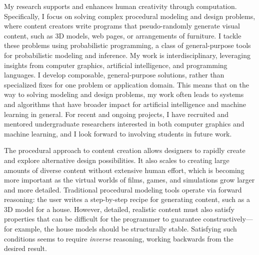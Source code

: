 \documentclass[
10pt, %
a4paper, %
oneside, %
headinclude,footinclude, %
BCOR5mm, %
]{scrartcl}
\title{\normalfont\spacedallcaps{Daniel Ritchie}} %
\author{\spacedallcaps{Research Statement}} %
\date{} %
\begin{document}

\pagestyle{scrheadings}
\clearscrheadings
\newcommand{\headertext}{\spacedlowsmallcaps{\color{black} Daniel Ritchie \color{halfgray} Research Statement}}
\ohead{\headertext}
\cfoot[\pagemark]{\pagemark}


\maketitle

My research supports and enhances human creativity through computation.
Specifically, I focus on solving complex procedural modeling and design problems, where content creators write programs that pseudo-randomly generate visual content, such as 3D models, web pages, or arrangements of furniture. I tackle these problems using probabilistic programming, a class of general-purpose tools for probabilistic modeling and inference.
My work is interdisciplinary, leveraging insights from computer graphics, artificial intelligence, and programming languages. I develop composable, general-purpose solutions, rather than specialized fixes for one problem or application domain. This means that on the way to solving modeling and design problems, my work often leads to systems and algorithms that have broader impact for artificial intelligence and machine learning in general. For recent and ongoing projects, I have recruited and mentored undergraduate researchers interested in both computer graphics and machine learning, and I look forward to involving students in future work.

The procedural approach to content creation allows designers to rapidly create and explore alternative design possibilities. It also scales to creating large amounts of diverse content without extensive human effort, which is becoming more important as the virtual worlds of films, games, and simulations grow larger and more detailed. Traditional procedural modeling tools operate via forward reasoning: the user writes a step-by-step recipe for generating content, such as a 3D model for a house. However, detailed, realistic content must also satisfy properties that can be difficult for the programmer to guarantee constructively---for example, the house models should be structurally stable. Satisfying such conditions seems to require \emph{inverse} reasoning, working backwards from the desired result.
\end{document}
